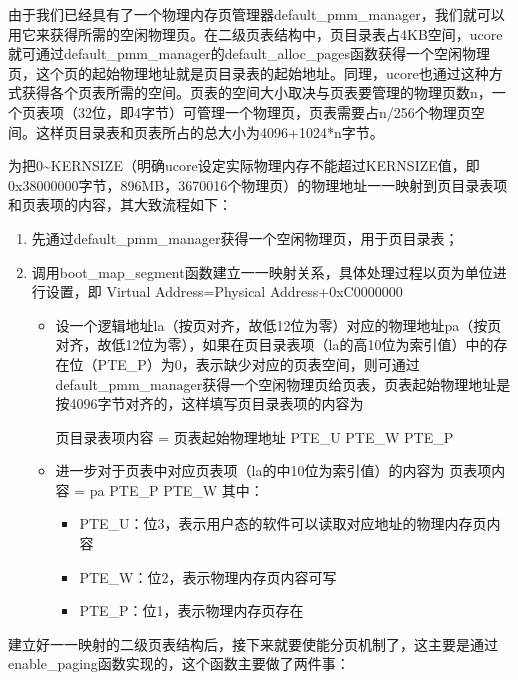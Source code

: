 由于我们已经具有了一个物理内存页管理器default\_pmm\_manager，我们就可以用它来获得所需的空闲物理页。在二级页表结构中，页目录表占4KB空间，ucore就可通过default\_pmm\_manager的default\_alloc\_pages函数获得一个空闲物理页，这个页的起始物理地址就是页目录表的起始地址。同理，ucore也通过这种方式获得各个页表所需的空间。页表的空间大小取决与页表要管理的物理页数n，一个页表项（32位，即4字节）可管理一个物理页，页表需要占n/256个物理页空间。这样页目录表和页表所占的总大小为4096+1024*n字节。

为把0\textasciitilde{}KERNSIZE（明确ucore设定实际物理内存不能超过KERNSIZE值，即0x38000000字节，896MB，3670016个物理页）的物理地址一一映射到页目录表项和页表项的内容，其大致流程如下：

\begin{enumerate}
\def\labelenumi{\arabic{enumi}.}
\item
  先通过default\_pmm\_manager获得一个空闲物理页，用于页目录表；
\item
  调用boot\_map\_segment函数建立一一映射关系，具体处理过程以页为单位进行设置，即
  Virtual Address=Physical Address+0xC0000000

  \begin{itemize}
  \item
    设一个逻辑地址la（按页对齐，故低12位为零）对应的物理地址pa（按页对齐，故低12位为零），如果在页目录表项（la的高10位为索引值）中的存在位（PTE\_P）为0，表示缺少对应的页表空间，则可通过default\_pmm\_manager获得一个空闲物理页给页表，页表起始物理地址是按4096字节对齐的，这样填写页目录表项的内容为

    页目录表项内容 = 页表起始物理地址\textbar{} PTE\_U \textbar{} PTE\_W
    \textbar{} PTE\_P
  \item
    进一步对于页表中对应页表项（la的中10位为索引值）的内容为 页表项内容
    = pa \textbar{} PTE\_P \textbar{} PTE\_W 其中：

    \begin{itemize}
    \item
      PTE\_U：位3，表示用户态的软件可以读取对应地址的物理内存页内容
    \item
      PTE\_W：位2，表示物理内存页内容可写
    \item
      PTE\_P：位1，表示物理内存页存在
    \end{itemize}
  \end{itemize}
\end{enumerate}

建立好一一映射的二级页表结构后，接下来就要使能分页机制了，这主要是通过enable\_paging函数实现的，这个函数主要做了两件事：

